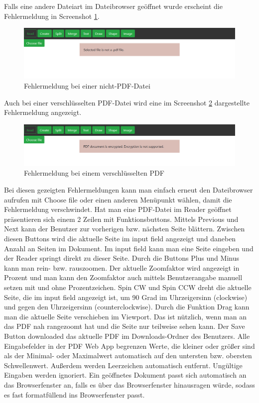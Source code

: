 Falls eine andere Dateiart im Dateibrowser geöffnet wurde erscheint die Fehlermeldung in Screenshot \ref{fig:errorfile}. 

\begin{figure}[!htbp]
	\centering
	\includegraphics[width=1\textwidth]{"images/errorfile.png"}
	\caption{Fehlermeldung bei einer nicht-PDF-Datei}
	\label{fig:errorfile}
\end{figure}

Auch bei einer verschlüsselten PDF-Datei wird eine im Screenshot \ref{fig:errorcrypt} dargestellte Fehlermeldung angezeigt.

\begin{figure}[!htbp]
	\centering
	\includegraphics[width=1\textwidth]{"images/errorcrypt.png"}
	\caption{Fehlermeldung bei einem verschlüsselten PDF}
	\label{fig:errorcrypt}
\end{figure}

Bei diesen gezeigten Fehlermeldungen kann man einfach erneut den Dateibrowser aufrufen mit Choose file oder einen anderen Menüpunkt wählen, damit die Fehlermeldung verschwindet. Hat man eine PDF-Datei im Reader geöffnet präsentieren sich einem 2 Zeilen mit Funktionsbuttons. Mittels Previous und Next kann der Benutzer zur vorherigen bzw. nächsten Seite blättern. Zwischen diesen Buttons wird die aktuelle Seite im input field angezeigt und daneben Anzahl an Seiten im Dokument. Im input field kann man eine Seite eingeben und der Reader springt direkt zu dieser Seite. Durch die Buttons Plus und Minus kann man rein- bzw. rauszoomen. Der aktuelle Zoomfaktor wird angezeigt in Prozent und man kann den Zoomfaktor auch mittels Benutzerangabe manuell setzen mit und ohne Prozentzeichen. Spin CW und Spin CCW dreht die aktuelle Seite, die im input field angezeigt ist, um 90 Grad im Uhrzeigersinn (clockwise) und gegen den Uhrzeigersinn (counterclockwise). Durch die Funktion Drag kann man die aktuelle Seite verschieben im Viewport. Das ist nützlich, wenn man an das PDF nah rangezoomt hat und die Seite nur teilweise sehen kann. Der Save Button downloaded das aktuelle PDF im Downloads-Ordner des Benutzers. Alle Eingabefelder in der PDF Web App begrenzen Werte, die kleiner oder größer sind als der Minimal- oder Maximalwert automatisch auf den untersten bzw. obersten Schwellenwert. Außerdem werden Leerzeichen automatisch entfernt. Ungültige Eingaben werden ignoriert. Ein geöffnetes Dokument passt sich automatisch an das Browserfenster an, falls es über das Browserfenster hinausragen würde, sodass es fast formatfüllend ins Browserfenster passt. \\


